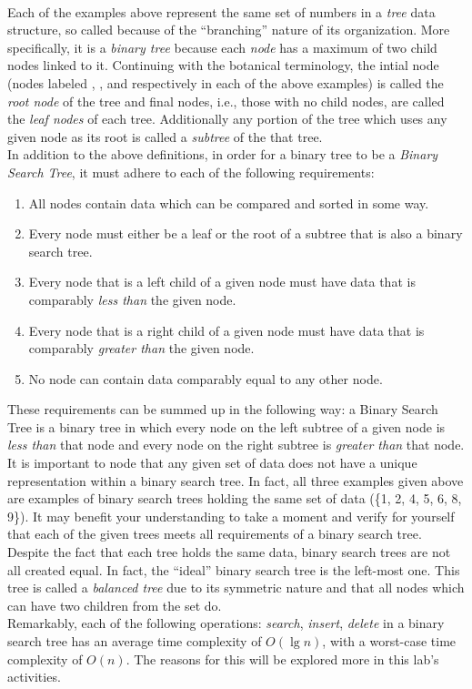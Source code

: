 		\ \\[9pt]
		Each of the examples above represent the same set of numbers in a \emph{tree} data structure, so called because of the ``branching'' nature of its organization. More specifically, it is a \emph{binary tree} because each \emph{node} has a maximum of two child nodes linked to it. Continuing with the botanical terminology, the intial node (nodes labeled , , and  respectively in each of the above examples) is called the \emph{root node} of the tree and final nodes, i.e., those with no child nodes, are called the \emph{leaf nodes} of each tree. Additionally any portion of the tree which uses any given node as its root is called a \emph{subtree} of the that tree.\\[\baselineskip]
		In addition to the above definitions, in order for a binary tree to be a \emph{Binary Search Tree}, it must adhere to each of the following requirements:
		\begin{enumerate}
			\item All nodes contain data which can be compared and sorted in some way.
			\item Every node must either be a leaf or the root of a subtree that is also a binary search tree.
			\item Every node that is a left child of a given node must have data that is comparably \emph{less than} the given node.
			\item Every node that is a right child of a given node must have data that is comparably \emph{greater than} the given node.
			\item No node can contain data comparably equal to any other node.
		\end{enumerate}
		These requirements can be summed up in the following way: a Binary Search Tree is a binary tree in which every node on the left subtree of a given node is \emph{less than} that node and every node on the right subtree is \emph{greater than} that node.\\[\baselineskip]
		It is important to node that any given set of data does not have a unique representation within a binary search tree. In fact, all three examples given above are examples of binary search trees holding the same set of data (\{1, 2, 4, 5, 6, 8, 9\}). It may benefit your understanding to take a moment and verify for yourself that each of the given trees meets all requirements of a binary search tree. Despite the fact that each tree holds the same data, binary search trees are not all created equal. In fact, the ``ideal'' binary search tree is the left-most one. This tree is called a \emph{balanced tree} due to its symmetric nature and that all nodes which can have two children from the set do.\\[\baselineskip]
		Remarkably, each of the following operations: \emph{search}, \emph{insert}, \emph{delete} in a binary search tree has an average time complexity of $O(\lg n)$, with a worst-case time complexity of $O(n)$. The reasons for this will be explored more in this lab's activities.

